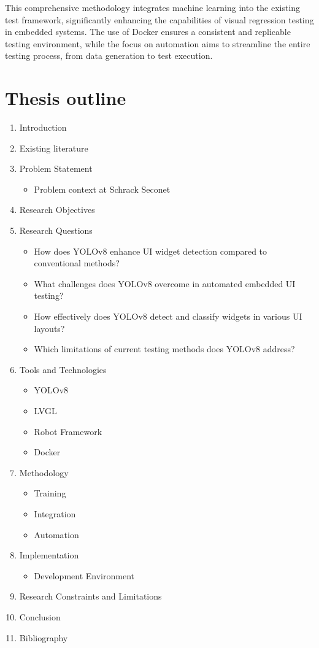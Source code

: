 \documentclass[Proposal,BIC,english,IEEE]{BASE/twbook} %
\begin{document}
This comprehensive methodology integrates machine learning into the existing test framework, significantly enhancing the capabilities of visual regression testing in embedded systems. The use of Docker ensures a consistent and replicable testing environment, while the focus on automation aims to streamline the entire testing process, from data generation to test execution.

\newpage
\chapter{Thesis outline}
\begin{enumerate}
    \item Introduction
    \item Existing literature
    \item Problem Statement
          \begin{itemize}
              \item Problem context at Schrack Seconet
          \end{itemize}
    \item Research Objectives
    \item Research Questions
          \begin{itemize}
              \item How does YOLOv8 enhance UI widget detection compared to conventional methods?
              \item What challenges does YOLOv8 overcome in automated embedded UI testing?
              \item How effectively does YOLOv8 detect and classify widgets in various UI layouts?
              \item Which limitations of current testing methods does YOLOv8 address?
          \end{itemize}
    \item Tools and Technologies
          \begin{itemize}
              \item YOLOv8
              \item LVGL
              \item Robot Framework
              \item Docker
          \end{itemize}
    \item Methodology
          \begin{itemize}
              \item Training
              \item Integration
              \item Automation
          \end{itemize}
    \item Implementation
          \begin{itemize}
              \item Development Environment
          \end{itemize}
    \item Research Constraints and Limitations
    \item Conclusion
    \item Bibliography
\end{enumerate}
\end{document}
